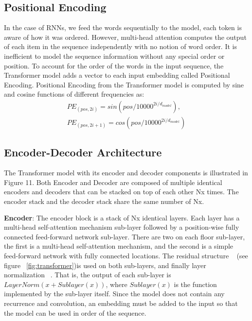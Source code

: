 \subsection{Positional Encoding}
In the case of RNNs, we feed the words sequentially to the model, each token is aware of how it was ordered. However, multi-head attention computes the output of each item in the sequence independently with no notion of word order. It is inefficient to model the sequence information without any special order or position. To account for the order of the words in the input sequence, the Transformer model adds a vector to each input embedding called Positional Encoding. Positional Encoding from the Transformer model is computed by sine and cosine functions of different frequencies as:
\begin{equation}
	\begin{aligned}
	PE_{(pos,2i)} = sin(pos/10000^{2i/d_{model}}),\\
	PE_{(pos,2i+1)} = cos(pos/10000^{2i/d_{model}})
	\end{aligned}
	\label{equ:position_embedding}
\end{equation}

\subsection{Encoder-Decoder Architecture}
The Transformer model with its encoder and decoder components is illustrated in Figure 11. Both Encoder and Decoder are composed of multiple identical encoders and decoders that can be stacked on top of each other Nx times. The encoder stack and the decoder stack share the same number of Nx.

\textbf{Encoder}: The encoder block is a stack of Nx identical layers. Each layer has a multi-head self-attention mechanism sub-layer followed by a position-wise fully connected feed-forward network sub-layer. There are two on each floor sub-layer, the first is a multi-head self-attention mechanism, and the second is a simple feed-forward network with fully connected locations. The residual structure ~\cite{He_2016_CVPR} (see figure ~\ref{fig:transformer})is used on both sub-layers, and finally layer normalization ~\cite{ba2016layer}. That is, the output of each sub-layer is $LayerNorm(x + Sublayer(x))$, where $Sublayer(x)$ is the function implemented by the sub-layer itself. Since the model does not contain any recurrence and convolution, an embedding must be added to the input so that the model can be used in order of the sequence.

